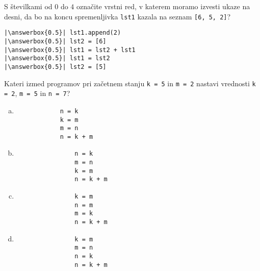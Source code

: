 \documentclass[arhiv, 10pt]{../izpit}
\newcommand{\inlinepy}[1]{\texttt{#1}}
\newcommand{\answerbox}[1]{\framebox{\vphantom{\large M}\hspace{#1cm}}}
\begin{document}
        \naloga*
        \begin{multicols}{2}
        \noindent 
        S številkami od $0$ do $4$ označite vrstni red, v katerem moramo izvesti ukaze na desni, da bo na koncu spremenljivka \inlinepy{lst1} kazala na seznam \inlinepy{[6, 5, 2]}?
    
        \columnbreak
        \noindent
        \begin{verbatim}
|\answerbox{0.5}| lst1.append(2)
|\answerbox{0.5}| lst2 = [6]
|\answerbox{0.5}| lst1 = lst2 + lst1
|\answerbox{0.5}| lst1 = lst2
|\answerbox{0.5}| lst2 = [5]

        \end{verbatim}
        \end{multicols}
    
            
        \naloga*
        
        Kateri izmed programov pri začetnem stanju
            \inlinepy{k = 5} in
            \inlinepy{m = 2}
        nastavi vrednosti
            \inlinepy{k = 2},
            \inlinepy{m = 5} in
            \inlinepy{n = 7}?
    
        \begin{multicols}{4}
        \begin{enumerate}[(a)]
\item 
            \begin{verbatim}
            n = k
            k = m
            m = n
            n = k + m
            \end{verbatim}
        
\item 
                \begin{verbatim}
                n = k
                m = n
                k = m
                n = k + m
                \end{verbatim}
            
\item 
                \begin{verbatim}
                k = m
                n = m
                m = k
                n = k + m
                \end{verbatim}
            
\item 
                \begin{verbatim}
                k = m
                m = n
                n = k
                n = k + m
                \end{verbatim}
            
\end{enumerate}

        \end{multicols}
    
\end{document}
